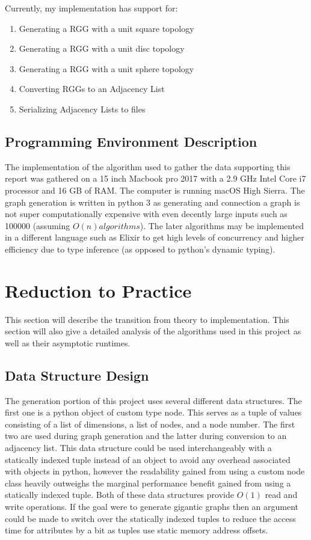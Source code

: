 \documentclass{article}
\begin{document}
  Currently, my implementation has support for:
  \begin{enumerate}
		\item Generating a RGG with a unit square topology
		\item Generating a RGG with a unit disc topology
    \item Generating a RGG with a unit sphere topology
		\item Converting RGGs to an Adjacency List
		\item Serializing Adjacency Lists to files
  \end{enumerate}

  \subsection{Programming Environment Description}
		The implementation of the algorithm used to gather the data supporting this report was gathered on a 15 inch Macbook pro 2017 with a 2.9 GHz Intel Core i7 processor and 16 GB of RAM.
		The computer is running macOS High Sierra.
		The graph generation is written in python 3 as generating and connection a graph is not super computationally expensive with even decently large inputs such as 100000 (assuming $O(n) algorithms$).
		The later algorithms may be implemented in a different language such as Elixir to get high levels of concurrency and higher efficiency due to type inference (as opposed to python's dynamic typing).
  \section{Reduction to Practice}
    This section will describe the transition from theory to implementation.
    This section will also give a detailed analysis of the algorithms used in this project as well as their asymptotic runtimes.
	\subsection{Data Structure Design}
		The generation portion of this project uses several different data structures.
		The first one is a python object of custom type node.
		This serves as a tuple of values consisting of a list of dimensions, a list of nodes, and a node number.
		The first two are used during graph generation and the latter during conversion to an adjacency list.
		This data structure could be used interchangeably with a statically indexed tuple instead of an object to avoid any overhead associated with objects in python, however the readability gained from using a custom node class heavily outweighs the marginal performance benefit gained from using a statically indexed tuple.
		Both of these data structures provide $O(1)$ read and write operations.
		If the goal were to generate gigantic graphs then an argument could be made to switch over the statically indexed tuples to reduce the access time for attributes by a bit as tuples use static memory address offsets.
\end{document}
